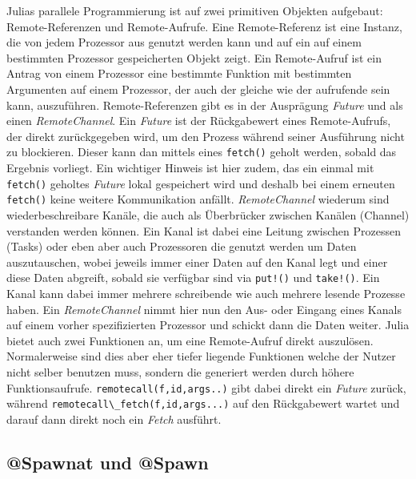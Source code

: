 \documentclass[proseminar,german,utf8]{zihpub}
\begin{document}
Julias parallele Programmierung ist auf zwei primitiven Objekten aufgebaut: Remote-Referenzen und Remote-Aufrufe. Eine Remote-Referenz ist eine Instanz, die von jedem Prozessor aus genutzt werden kann und auf ein auf einem bestimmten Prozessor gespeicherten Objekt zeigt. Ein Remote-Aufruf ist ein Antrag von einem Prozessor eine bestimmte Funktion mit bestimmten Argumenten auf einem Prozessor, der auch der gleiche wie der aufrufende sein kann, auszuführen. Remote-Referenzen gibt es in der Ausprägung \textit{Future} und als einen \textit{RemoteChannel}. Ein \textit{Future} ist der Rückgabewert eines Remote-Aufrufs, der direkt zurückgegeben wird, um den Prozess während seiner Ausführung nicht zu blockieren. Dieser kann dan mittels eines \verb|fetch()| geholt werden, sobald das Ergebnis vorliegt. Ein wichtiger Hinweis ist hier zudem, das ein einmal mit \verb|fetch()| geholtes \textit{Future} lokal gespeichert wird und deshalb bei einem erneuten \verb|fetch()| keine weitere Kommunikation anfällt. \textit{RemoteChannel} wiederum sind wiederbeschreibare Kanäle, die auch als Überbrücker zwischen Kanälen (Channel) verstanden werden können. Ein Kanal ist dabei eine Leitung zwischen Prozessen (Tasks) oder eben aber auch Prozessoren die genutzt werden um Daten auszutauschen, wobei jeweils immer einer Daten auf den Kanal legt und einer diese Daten abgreift, sobald sie verfügbar sind via \verb|put!()| und \verb|take!()|. Ein Kanal kann dabei immer mehrere schreibende wie auch mehrere lesende Prozesse haben. Ein \textit{RemoteChannel} nimmt hier nun den Aus- oder Eingang eines Kanals auf einem vorher spezifizierten Prozessor und schickt dann die Daten weiter. Julia bietet auch zwei Funktionen an, um eine Remote-Aufruf direkt auszulösen. Normalerweise sind dies aber eher tiefer liegende Funktionen welche der Nutzer nicht selber benutzen muss, sondern die generiert werden durch höhere Funktionsaufrufe. \verb|remotecall(f,id,args..)| gibt dabei direkt ein \textit{Future} zurück, während \verb|remotecall\_fetch(f,id,args...)| auf den Rückgabewert wartet und darauf dann direkt noch ein \textit{Fetch} ausführt.~\cite{JuliaLangDocumentation}

\subsection{@Spawnat und @Spawn}
\end{document}
